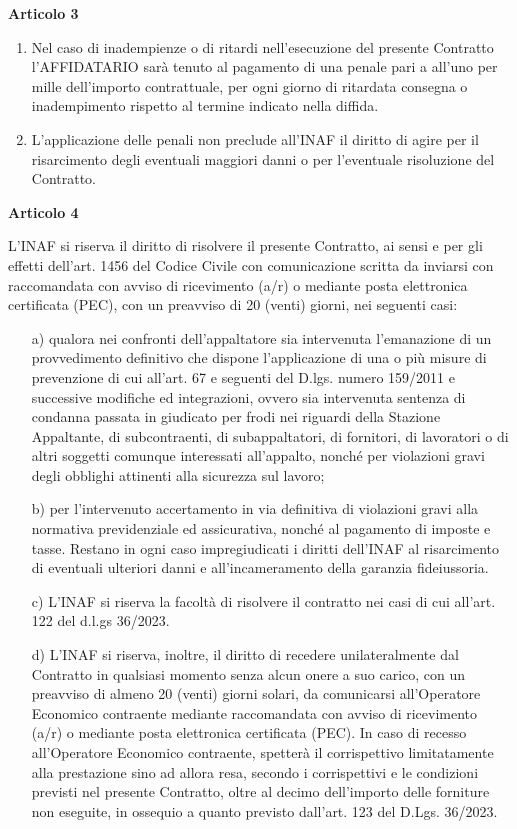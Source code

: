 \textbf{Articolo 3}

\begin{enumerate}
	\item Nel caso di inadempienze o di ritardi nell'esecuzione del presente
Contratto l'AFFIDATARIO sarà tenuto al pagamento di una penale pari
a all'uno per mille dell'importo contrattuale, per ogni giorno di
ritardata consegna o inadempimento rispetto al termine indicato nella
diffida.

\item L'applicazione delle penali non preclude all'INAF il diritto di agire
per il risarcimento degli eventuali maggiori danni o per l'eventuale
risoluzione del Contratto.
\end{enumerate}


\textbf{Articolo 4}

L'INAF si riserva il diritto di risolvere il presente Contratto, ai sensi
e per gli effetti dell'art. 1456 del Codice Civile con comunicazione
scritta da inviarsi con raccomandata con avviso di ricevimento (a/r)
o mediante posta elettronica certificata (PEC), con un preavviso di 20
(venti) giorni, nei seguenti casi:

\begin{itemize}
\item[a)] qualora nei confronti dell'appaltatore sia intervenuta l'emanazione
di un provvedimento definitivo che dispone l'applicazione di una o più
misure di prevenzione di cui all'art. 67 e seguenti del D.lgs. numero
159/2011 e successive modifiche ed integrazioni, ovvero sia intervenuta
sentenza di condanna passata in giudicato per frodi nei riguardi della
Stazione Appaltante, di subcontraenti, di subappaltatori, di fornitori,
di lavoratori o di altri soggetti comunque interessati all'appalto,
nonché per violazioni gravi degli obblighi attinenti alla sicurezza
sul lavoro; 

\item[b)] per l'intervenuto accertamento in via definitiva di violazioni gravi
alla normativa previdenziale ed assicurativa, nonché al pagamento di
imposte e tasse. Restano in ogni caso impregiudicati i diritti dell'INAF
al risarcimento di eventuali ulteriori danni e all'incameramento della
garanzia fideiussoria. 

\item[c)] L'INAF si riserva la facoltà di risolvere il contratto nei casi di
cui all'art. 122 del d.l.gs 36/2023.

\item[d)] L'INAF si riserva, inoltre, il diritto di recedere unilateralmente
dal Contratto in qualsiasi momento senza alcun onere a suo carico,
con un preavviso di almeno 20 (venti) giorni solari, da comunicarsi
all'Operatore Economico contraente mediante raccomandata con
avviso di ricevimento (a/r) o mediante posta elettronica certificata
(PEC). In caso di recesso all'Operatore Economico contraente, spetterà
il corrispettivo limitatamente alla prestazione sino ad allora resa,
secondo i corrispettivi e le condizioni previsti nel presente Contratto,
oltre al decimo dell'importo delle forniture non eseguite, in ossequio
a quanto previsto dall'art. 123 del D.Lgs. 36/2023. 
\end{itemize}


